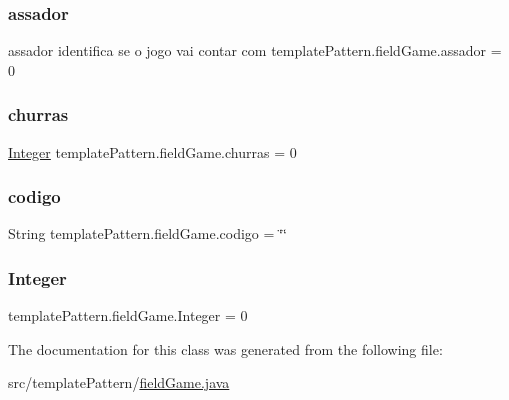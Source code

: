 \subsubsection{\texorpdfstring{assador}{assador}}
{\footnotesize\ttfamily assador identifica se o jogo vai contar com template\+Pattern.\+field\+Game.\+assador = 0}

\mbox{\label{classtemplate_pattern_1_1field_game_ae267f73c56fae92e58cca87d52f6bbbe}} 
\subsubsection{\texorpdfstring{churras}{churras}}
{\footnotesize\ttfamily \mbox{\hyperlink{classtemplate_pattern_1_1field_game_a86770a332e3047d7ad165a16d44dc2e4}{Integer}} template\+Pattern.\+field\+Game.\+churras = 0}

\mbox{\label{classtemplate_pattern_1_1field_game_a8d9280367beb48b44a71265ebd2aed95}} 
\subsubsection{\texorpdfstring{codigo}{codigo}}
{\footnotesize\ttfamily String template\+Pattern.\+field\+Game.\+codigo = \char`\"{}\char`\"{}}

\mbox{\label{classtemplate_pattern_1_1field_game_a86770a332e3047d7ad165a16d44dc2e4}} 
\subsubsection{\texorpdfstring{Integer}{Integer}}
{\footnotesize\ttfamily template\+Pattern.\+field\+Game.\+Integer = 0}



The documentation for this class was generated from the following file\+:\begin{DoxyCompactItemize}
\item 
src/template\+Pattern/\mbox{\hyperlink{field_game_8java}{field\+Game.\+java}}\end{DoxyCompactItemize}
